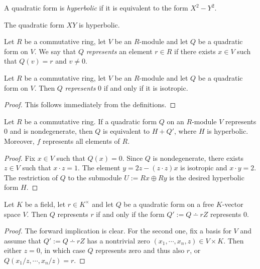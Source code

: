 \begin{definition}\label{def:hyperbolic}
\leanok
A quadratic form is \emph{hyperbolic} if it is equivalent to the form $X^2 - Y^2$.
\end{definition}

\begin{lemma}\label{lem:XY_hyperbolic}
\leanok
{}
The quadratic form $XY$ is hyperbolic.
\end{lemma}

\begin{definition}\label{def:represents}
\leanok
Let $R$ be a commutative ring, let $V$ be an $R$-module and let $Q$ be a quadratic form on $V$. We say that $Q$ \emph{represents} an element $r \in R$ if there exists $x \in V$ such that $Q(v) = r$ and $v \ne 0$.
\end{definition}

\begin{lemma}\label{lem:represents_zero}
\leanok
{}
Let $R$ be a commutative ring, let $V$ be an $R$-module and let $Q$ be a quadratic form on $V$. Then $Q$ \emph{represents} $0$ if and only if it is isotropic.
\end{lemma}
\begin{proof}
This follows immediately from the definitions.
\end{proof}

\begin{proposition}\label{prop:sum_hyperbolic}
\leanok
{}
Let $R$ be a commutative ring. If a quadratic form $Q$ on an $R$-module $V$ represents $0$ and is nondegenerate, then $Q$ is equivalent to $H + Q'$, where $H$ is hyperbolic. Moreover, $f$ represents all elements of $R$.
\end{proposition}
\begin{proof}
Fix $x \in V$ such that $Q(x) = 0$. Since $Q$ is nondegenerate, there exists $z \in V$ such that $x \cdot z = 1$. The element $y = 2z - (z\cdot z)x$ is isotropic and $x \cdot y = 2$.
The restriction of $Q$ to the submodule $U := Rx \oplus Ry$ is the desired hyperbolic form $H$.
\end{proof}

\begin{corollary}\label{cor:represents_iff}
\leanok	
Let $K$ be a field, let $r \in K^\times$ and let $Q$ be a quadratic form on a free $K$-vector space $V$. Then $Q$ represents $r$ if and only if the form $Q' := Q \dotminus rZ$ represents $0$.
\end{corollary}
\begin{proof}
The forward implication is clear. For the second one, fix a basis for $V$ and assume that $Q' := Q \dotminus rZ$ has a nontrivial zero $(x_1, \cdots, x_n, z) \in V \times K$. Then either $z = 0$, in which case $Q$ represents zero and thus also $r$, or $Q(x_1/z, \cdots, x_n/z) = r$.
\end{proof}

